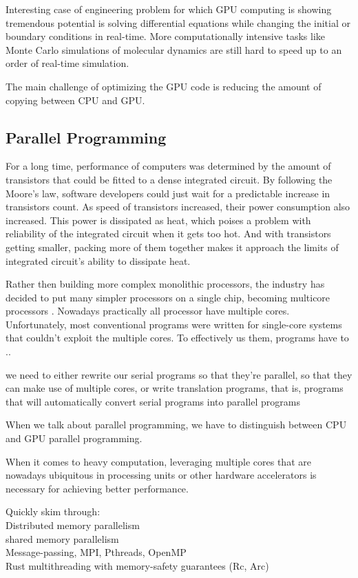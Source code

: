 Interesting case of engineering problem for which GPU computing is showing tremendous potential is solving differential equations while changing the initial or boundary conditions in real-time. More computationally intensive tasks like Monte Carlo simulations of molecular dynamics are still hard to speed up to an order of real-time simulation.

The main challenge of optimizing the GPU code is reducing the amount of copying between CPU and GPU.

\subsection{Parallel Programming}

For a long time, performance of computers was determined by the amount of transistors that could be fitted to a dense integrated circuit. By following the Moore's law, software developers could just wait for a predictable increase in transistors count. As speed of transistors increased, their power consumption also increased. This power is dissipated as heat, which poises a problem with reliability of the integrated circuit when it gets too hot. And with transistors getting smaller, packing more of them together makes it approach the limits of integrated circuit's ability to dissipate heat.

Rather then building more complex monolithic processors, the industry has decided to put many simpler processors on a single chip, becoming multicore processors \citep{PACHECO20111}. Nowadays practically all processor have multiple cores. Unfortunately, most conventional programs were written for single-core systems that couldn't exploit the multiple cores. To effectively us them, programs have to .. %

we need to either rewrite our serial programs so that they’re parallel, so that they can make use of multiple cores, or write translation programs, that is, programs that will automatically convert serial programs into parallel programs


When we talk about parallel programming, we have to distinguish between CPU and GPU parallel programming.

When it comes to heavy computation, leveraging multiple cores that are nowadays ubiquitous in processing units or other hardware accelerators is necessary for achieving better performance.

Quickly skim through: \\
Distributed memory parallelism \\
shared memory parallelism \\
Message-passing, MPI, Pthreads, OpenMP \\
Rust multithreading with memory-safety guarantees (Rc, Arc)

